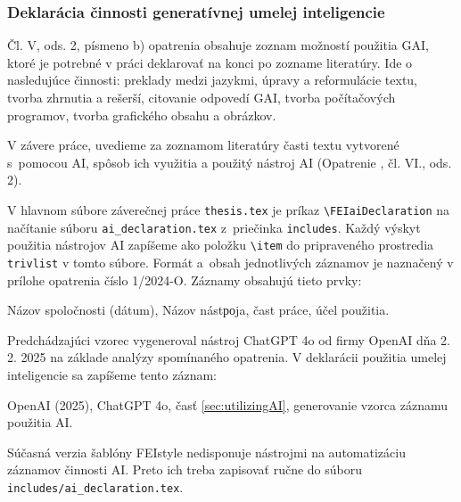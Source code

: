 \documentclass[../../../thesis.tex]{subfiles}
\begin{document}
\subsubsection*{Deklarácia činnosti generatívnej umelej inteligencie}
Čl. V, ods. 2, písmeno b) opatrenia obsahuje zoznam možností použitia GAI, ktoré je potrebné v práci deklarovať na konci po zozname literatúry.
Ide o nasledujúce činnosti: preklady medzi jazykmi, úpravy a reformulácie textu, tvorba zhrnutia a rešerší, citovanie odpovedí GAI, tvorba počítačových programov, tvorba grafického obsahu a obrázkov.

V závere práce, uvedieme za zoznamom literatúry
časti textu vytvorené s~pomocou AI, spôsob ich využitia a použitý nástroj AI (Opatrenie \cite{opatrenie12024}, čl. VI., ods. 2).

V hlavnom súbore záverečnej práce \verb|thesis.tex| je príkaz
\verb|\FEIaiDeclaration| na načítanie súboru \verb|ai_declaration.tex| z~priečinka \verb|includes|.
Každý výskyt použitia nástrojov AI zapíšeme ako
položku \verb|\item| do pripraveného prostredia
\verb|trivlist| v tomto súbore.
Formát a~obsah jednotlivých záznamov je naznačený v prílohe opatrenia číslo 1/2024-O.
Záznamy obsahujú tieto prvky:
\begin{trivlist}
  \item Názov spoločnosti (dátum), Názov nástроja, čast práce, účel použitia.
\end{trivlist}

Predchádzajúci vzorec vygeneroval nástroj ChatGPT 4o od firmy
OpenAI dňa 2. 2. 2025 na základe analýzy spomínaného opatrenia.
V deklarácii použitia umelej inteligencie sa zapíšeme tento
záznam:
\begin{trivlist}
  \item OpenAI (2025), ChatGPT 4o, časť \ref{sec:utilizingAI},
  generovanie vzorca záznamu použitia AI.
\end{trivlist}

Súčasná verzia šablóny FEIstyle nedisponuje nástrojmi na
automatizáciu záznamov činnosti AI.
Preto ich treba zapisovať ručne do súboru
\verb|includes/ai_declaration.tex|.
\end{document}
